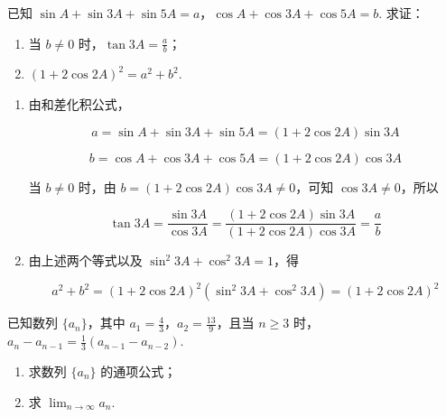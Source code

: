 \begin{problem}
已知 \(\sin A + \sin 3A + \sin 5A = a\)，\(\cos A + \cos 3A + \cos 5A = b\). 求证：

\begin{enumerate}
\item 当 \(b \neq 0\) 时，\(\tan 3A = \frac{a}{b}\)；
\item \(\left(1 + 2\cos 2A\right)^2 = a^2 + b^2\).
\end{enumerate}
\end{problem}

\begin{solution}
\begin{enumerate}
\item 由和差化积公式，

\[
a=\sin A+\sin 3A+\sin 5A=\left(1+2\cos 2A\right)\sin 3A
\]

\[
b=\cos A+\cos 3A+\cos 5A=\left(1+2\cos 2A\right)\cos 3A
\]

当 \(b\neq0\) 时，由 \(b=\left(1+2\cos 2A\right)\cos 3A\neq0\)，可知 \(\cos 3A\neq0\)，所以

\[
\tan 3A=\frac{\sin 3A}{\cos 3A}=\frac{\left(1+2\cos 2A\right)\sin 3A}{\left(1+2\cos 2A\right)\cos 3A}=\frac{a}{b}
\]

\item 由上述两个等式以及 \(\sin^2 3A+\cos^2 3A=1\)，得

\[
a^2+b^2=\left(1+2\cos 2A\right)^2\left(\sin^2 3A+\cos^2 3A\right)=\left(1+2\cos 2A\right)^2
\]

\end{enumerate}
\end{solution}

\begin{problem}
已知数列 \(\{a_n\}\)，其中 \(a_1 = \frac{4}{3}\)，\(a_2 = \frac{13}{9}\)，且当 \(n \geqslant 3\) 时，\(a_n - a_{n-1} = \frac{1}{3}\left(a_{n-1} - a_{n-2}\right)\).

\begin{enumerate}
\item 求数列 \(\{a_n\}\) 的通项公式；
\item 求 \(\displaystyle\lim_{n\to\infty} a_n\).
\end{enumerate}
\end{problem}

